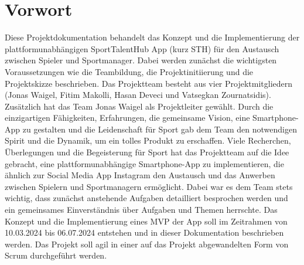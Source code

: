 \chapter{Vorwort}
Diese Projektdokumentation behandelt das Konzept und die Implementierung der plattformunabhängigen SportTalentHub App (kurz STH) für den Austausch zwischen Spieler und Sportmanager.
Dabei werden zunächst die wichtigsten Voraussetzungen wie die Teambildung, die Projektinitiierung und die Projektskizze beschrieben.
Das Projektteam besteht aus vier Projektmitgliedern (Jonas Waigel, Fitim Makolli, Hasan Deveci und Vatsegkan Zournatsidis). 
Zusätzlich hat das Team Jonas Waigel als Projektleiter gewählt.
Durch die einzigartigen Fähigkeiten, Erfahrungen, die gemeinsame Vision, eine Smartphone-App zu gestalten und die Leidenschaft für Sport gab dem Team den notwendigen Spirit und die Dynamik, um ein tolles Produkt zu erschaffen.
\newline
Viele Recherchen, Überlegungen und die Begeisterung für Sport hat das Projektteam auf die Idee gebracht, eine plattformunabhängige Smartphone-App zu implementieren, die ähnlich zur Social Media App Instagram den Austausch und das Anwerben zwischen Spielern und Sportmanagern ermöglicht.
\newline
Dabei war es dem Team stets wichtig, dass zunächst anstehende Aufgaben detailliert besprochen werden und ein gemeinsames Einverständnis über Aufgaben und Themen herrschte.
Das Konzept und die Implementierung eines MVP der App soll im Zeitrahmen von 10.03.2024 bis 06.07.2024 entstehen und in dieser Dokumentation beschrieben werden.
Das Projekt soll agil in einer auf das Projekt abgewandelten Form von Scrum durchgeführt werden.


